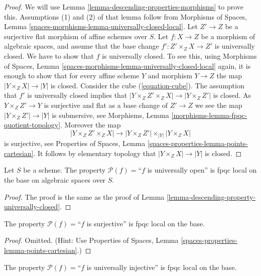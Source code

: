 \begin{proof}
We will use
Lemma \ref{lemma-descending-properties-morphisms}
to prove this. Assumptions (1) and (2) of that lemma follow from
Morphisms of Spaces,
Lemma \ref{spaces-morphisms-lemma-universally-closed-local}.
Let $Z' \to Z$ be a surjective flat morphism of affine schemes over $S$.
Let $f : X \to Z$ be a morphism of algebraic spaces, and assume
that the base change $f' : Z' \times_Z X \to Z'$ is universally closed.
We have to show that $f$ is universally closed. To see this, using
Morphisms of Spaces,
Lemma \ref{spaces-morphisms-lemma-universally-closed-local}
again, it is enough to show that for every affine scheme $Y$ and
morphism $Y \to Z$ the map $|Y \times_Z X| \to |Y|$ is closed.
Consider the cube (\ref{equation-cube}).
The assumption that $f'$ is universally closed implies that
$|Y \times_Z Z' \times_Z X| \to |Y \times_Z Z'|$ is closed.
As $Y \times_Z Z' \to Y$ is surjective and flat as a base change of $Z' \to Z$
we see the map $|Y \times_Z Z'| \to |Y|$ is submersive, see
Morphisms, Lemma \ref{morphisms-lemma-fpqc-quotient-topology}.
Moreover the map
$$
|Y \times_Z Z' \times_Z X|
\longrightarrow
|Y \times_Z Z'| \times_{|Y|} |Y \times_Z X|
$$
is surjective, see
Properties of Spaces, Lemma \ref{spaces-properties-lemma-points-cartesian}.
It follows by elementary topology that $|Y \times_Z X| \to |Y|$ is closed.
\end{proof}

\begin{lemma}
\label{lemma-descending-property-universally-open}
Let $S$ be a scheme.
The property $\mathcal{P}(f) =$``$f$ is universally open''
is fpqc local on the base on algebraic spaces over $S$.
\end{lemma}

\begin{proof}
The proof is the same as the proof of
Lemma \ref{lemma-descending-property-universally-closed}.
\end{proof}

\begin{lemma}
\label{lemma-descending-property-surjective}
The property $\mathcal{P}(f) =$``$f$ is surjective''
is fpqc local on the base.
\end{lemma}

\begin{proof}
Omitted. (Hint: Use
Properties of Spaces, Lemma \ref{spaces-properties-lemma-points-cartesian}.)
\end{proof}

\begin{lemma}
\label{lemma-descending-property-universally-injective}
The property $\mathcal{P}(f) =$``$f$ is universally injective''
is fpqc local on the base.
\end{lemma}

